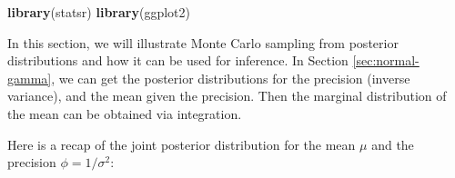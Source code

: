 \documentclass[]{book}
\newenvironment{Shaded}{\begin{snugshade}}{\end{snugshade}}
\newcommand{\KeywordTok}[1]{\textcolor[rgb]{0.13,0.29,0.53}{\textbf{{#1}}}}
\newcommand{\DecValTok}[1]{\textcolor[rgb]{0.00,0.00,0.81}{{#1}}}
\newcommand{\FloatTok}[1]{\textcolor[rgb]{0.00,0.00,0.81}{{#1}}}
\newcommand{\StringTok}[1]{\textcolor[rgb]{0.31,0.60,0.02}{{#1}}}
\newcommand{\NormalTok}[1]{{#1}}
\theoremstyle{definition}
\theoremstyle{definition}
\theoremstyle{definition}
\theoremstyle{remark}
\begin{document}
\begin{Shaded}
\end{Shaded}

\begin{Shaded}
\begin{Highlighting}[]
\KeywordTok{library}\NormalTok{(statsr)}
\KeywordTok{library}\NormalTok{(ggplot2)}
\end{Highlighting}
\end{Shaded}

In this section, we will illustrate Monte Carlo sampling from posterior
distributions and how it can be used for inference. In Section
\ref{sec:normal-gamma}, we can get the posterior distributions for the
precision (inverse variance), and the mean given the precision. Then the
marginal distribution of the mean can be obtained via integration.

Here is a recap of the joint posterior distribution for the mean \(\mu\)
and the precision \(\phi = 1/\sigma^2\):
\end{document}
